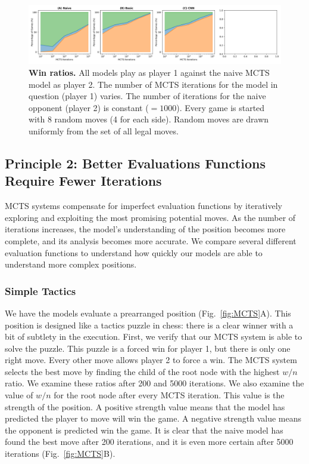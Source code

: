 \documentclass[10pt]{article}
\begin{document}
\begin{figure}[H]
    \centering
    \includegraphics[width=\linewidth]{win_rates.png}
    \caption{\textbf{Win ratios.} All models play as player 1 against the naive MCTS model as player 2. The number of MCTS iterations for the model in question (player 1) varies. The number of iterations for the naive opponent (player 2) is constant ($= 1000$). Every game is started with 8 random moves (4 for each side). Random moves are drawn uniformly from the set of all legal moves.}
    \label{fig:selfplay}
\end{figure}



\subsection{Principle 2: Better Evaluations Functions Require Fewer Iterations}

MCTS systems compensate for imperfect evaluation functions by iteratively exploring and exploiting the most promising potential moves. As the number of iterations increases, the model's understanding of the position becomes more complete, and its analysis becomes more accurate. We compare several different evaluation functions to understand how quickly our models are able to understand more complex positions.


\subsubsection{Simple Tactics}
We have the models evaluate a prearranged position (Fig.~\ref{fig:MCTS}A). This position is designed like a tactics puzzle in chess: there is a clear winner with a bit of subtlety in the execution. First, we verify that our MCTS system is able to solve the puzzle. This puzzle is a forced win for player 1, but there is only one right move. Every other move allows player 2 to force a win. The MCTS system selects the best move by finding the child of the root node with the highest $w / n$ ratio. We examine these ratios after 200 and 5000 iterations. We also examine the value of $w / n$ for the root node after every MCTS iteration. This value is the strength of the position. A positive strength value means that the model has predicted the player to move will win the game. A negative strength value means the opponent is predicted win the game. It is clear that the naive model has found the best move after 200 iterations, and it is even more certain after 5000 iterations (Fig.~\ref{fig:MCTS}B).
\end{document}
